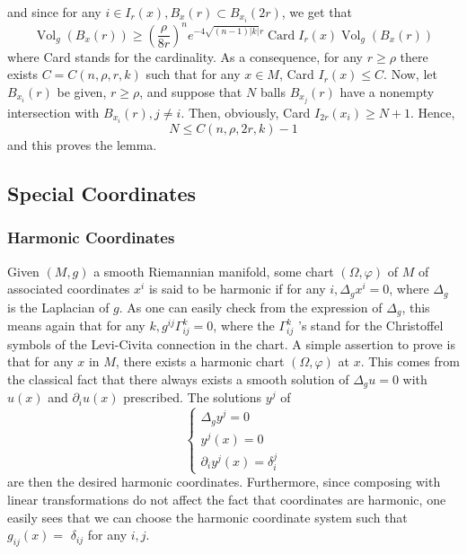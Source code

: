 \documentclass[12pt,hyperref,a4paper,UTF8]{ctexart}
\begin{document}
\begin{Proof}
$$    $$
    and since for any $i \in I_r(x), B_x(r) \subset B_{x_i}(2 r)$, we get that
    $$
    \operatorname{Vol}_g\left(B_x(r)\right) \geq\left(\frac{\rho}{8 r}\right)^n e^{-4 \sqrt{(n-1)|k|} r} \operatorname{Card} I_r(x) \operatorname{Vol}_g\left(B_x(r)\right)
    $$
    where Card stands for the cardinality. As a consequence, for any $r \geq \rho$ there exists $C=C(n, \rho, r, k)$ such that for any $x \in M$, Card $I_r(x) \leq C$. Now, let $B_{x_i}(r)$ be given, $r \geq \rho$, and suppose that $N$ balls $B_{x_j}(r)$ have a nonempty intersection with $B_{x_i}(r), j \neq i$. Then, obviously, Card $I_{2 r}\left(x_i\right) \geq N+1$. Hence,
    $$
    N \leq C(n, \rho, 2 r, k)-1
    $$
    and this proves the lemma.
\end{Proof}

\subsection{Special Coordinates}

\subsubsection{Harmonic Coordinates}
Given $(M, g)$ a smooth Riemannian manifold, some chart $(\Omega, \varphi)$ of $M$ of associated coordinates $x^i$ is said to be harmonic if for any $i, \Delta_g x^i=0$, where $\Delta_g$ is the Laplacian of $g$. As one can easily check from the expression of $\Delta_g$, this means again that for any $k, g^{i j} \Gamma_{i j}^k=0$, where the $\Gamma_{i j}^k$ 's stand for the Christoffel symbols of the Levi-Civita connection in the chart. A simple assertion to prove is that for any $x$ in $M$, there exists a harmonic chart $(\Omega, \varphi)$ at $x$. This comes from the classical fact that there always exists a smooth solution of $\Delta_g u=0$ with $u(x)$ and $\partial_i u(x)$ prescribed. The solutions $y^j$ of
$$
\left\{\begin{array}{l}
\Delta_g y^j=0 \\
y^j(x)=0 \\
\partial_i y^j(x)=\delta_i^j
\end{array}\right.
$$
are then the desired harmonic coordinates. Furthermore, since composing with linear transformations do not affect the fact that coordinates are harmonic, one easily sees that we can choose the harmonic coordinate system such that $g_{i j}(x)=$ $\delta_{i j}$ for any $i, j$.
\end{document}

